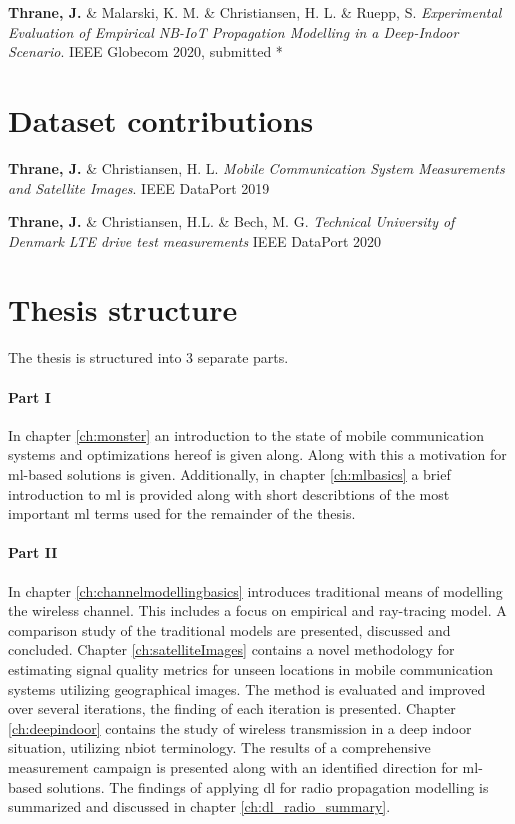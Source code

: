 \vspace{2em}
\noindent \textbf{Thrane, J.} \&  Malarski, K. M. \& Christiansen, H. L. \& Ruepp, S. \textit{Experimental Evaluation of Empirical NB-IoT Propagation Modelling in a Deep-Indoor Scenario}. IEEE Globecom 2020, submitted \cite{Thrane2020ExperimentalScenario} *


\section*{Dataset contributions}

\noindent \textbf{Thrane, J.} \& Christiansen, H. L. \textit{Mobile Communication System Measurements and Satellite Images}. IEEE DataPort 2019 \cite{1xf4-eg98-19}

\vspace{2em}
\noindent \textbf{Thrane, J.} \& Christiansen, H.L. \& Bech, M. G. \textit{Technical University of Denmark LTE drive test measurements} IEEE DataPort 2020 \cite{keyt-8g44-20}


\section*{Thesis structure}
 
The thesis is structured into 3 separate parts. 

\paragraph{Part I} In chapter \ref{ch:monster} an introduction to the state of mobile communication systems and optimizations hereof is given along. Along with this a motivation for \gls{ml}-based solutions is given. Additionally, in chapter \ref{ch:mlbasics} a brief introduction to \gls{ml} is provided along with short describtions of the most important \gls{ml} terms used for the remainder of the thesis. 

\paragraph{Part II} In chapter \ref{ch:channelmodellingbasics} introduces traditional means of modelling the wireless channel. This includes a focus on empirical and ray-tracing model. A comparison study of the traditional models are presented, discussed and concluded. Chapter \ref{ch:satelliteImages} contains a novel methodology for estimating signal quality metrics for unseen locations in mobile communication systems utilizing geographical images. The method is evaluated and improved over several iterations, the finding of each iteration is presented. Chapter \ref{ch:deepindoor} contains the study of wireless transmission in a deep indoor situation, utilizing \gls{nbiot} terminology. The results of a comprehensive measurement campaign is presented along with an identified direction for \gls{ml}-based solutions.  The findings of applying \gls{dl} for radio propagation modelling is summarized and discussed in chapter \ref{ch:dl_radio_summary}.


